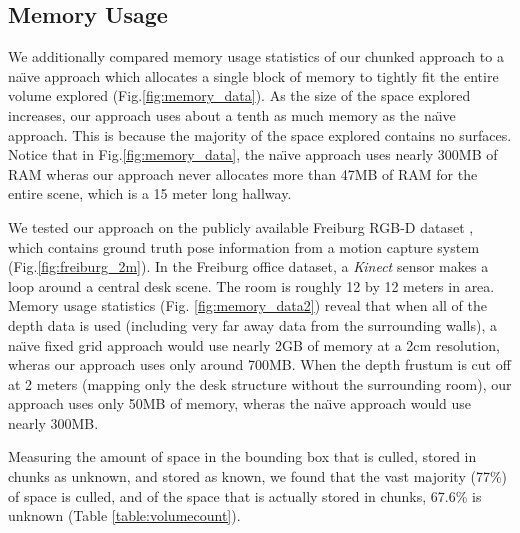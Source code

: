 \documentclass[10pt,twocolumn,letterpaper]{article}
\newcommand{\figref}[1]{Fig.\ref{#1}}
\begin{document}
\subsection{Memory Usage}
\label{section:memory}
We additionally compared memory usage statistics of our chunked approach to a
na\"{\i}ve approach which allocates a single block of memory to tightly fit the
entire volume explored (\figref{fig:memory_data}). As the size of the space
explored increases, our approach uses about a tenth as much memory as the
na\"{\i}ve approach. This is because the majority of the space explored contains no
surfaces. Notice that in \figref{fig:memory_data}, the na\"{\i}ve approach uses
nearly 300MB of RAM wheras our approach never allocates more than 47MB of RAM
for the entire scene, which is a 15 meter long hallway.

We tested our approach on the publicly available Freiburg RGB-D dataset
\cite{FREIBURG}, which contains ground truth pose information from a motion
capture system (\figref{fig:freiburg_2m}). In the Freiburg office dataset, a
\textit{Kinect} sensor makes a loop around a central desk scene. The room is
roughly 12 by 12 meters in area.  Memory usage statistics (Fig.
\ref{fig:memory_data2}) reveal that when all of the depth data is used
(including very far away data from the surrounding walls), a na\"{\i}ve fixed grid
approach would use nearly 2GB of memory at a 2cm resolution, wheras our
approach uses only around 700MB. When the depth frustum is cut off at 2 meters
(mapping only the desk structure without the surrounding room), our approach
uses only 50MB of memory, wheras the na\"{\i}ve approach would use nearly 300MB.

Measuring the amount of space in the bounding box that is culled, stored in
chunks as unknown, and stored as known, we found that the vast majority (77\%)
of space is culled, and of the space that is actually stored in chunks, 67.6\%
is unknown (Table \ref{table:volumecount}).

\end{document}
